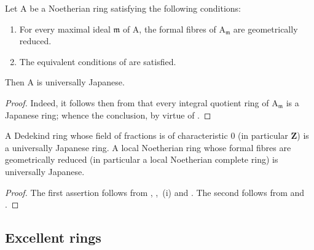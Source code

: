 \begin{corollary}[7.7.3]
\label{IV.7.7.3}
Let $\mathrm{A}$ be a Noetherian ring satisfying the following conditions:
\begin{enumerate}[label=(\roman*)]
  \item For every maximal ideal $\mathfrak{m}$ of $\mathrm{A}$, the formal fibres of $\mathrm{A}_\mathfrak{m}$ are geometrically reduced.
  \item The equivalent conditions of  are satisfied.
\end{enumerate}
Then $\mathrm{A}$ is universally Japanese.
\end{corollary}

\begin{proof}
Indeed, it follows then from  that every integral quotient ring of $\mathrm{A}_\mathfrak{m}$ is a Japanese ring; whence the conclusion, by virtue of .
\end{proof}

\begin{corollary}[7.7.4]
\label{IV.7.7.4}
A Dedekind ring whose field of fractions is of characteristic $0$ (in particular $\mathbf{Z}$) is a universally Japanese ring. A local Noetherian ring whose formal fibres are geometrically reduced (in particular a local Noetherian complete ring) is universally Japanese.
\end{corollary}

\begin{proof}
The first assertion follows from , ,~(i) and . The second follows from  and .
\end{proof}


\subsection{Excellent rings}
\label{subsection:IV.7.8}

